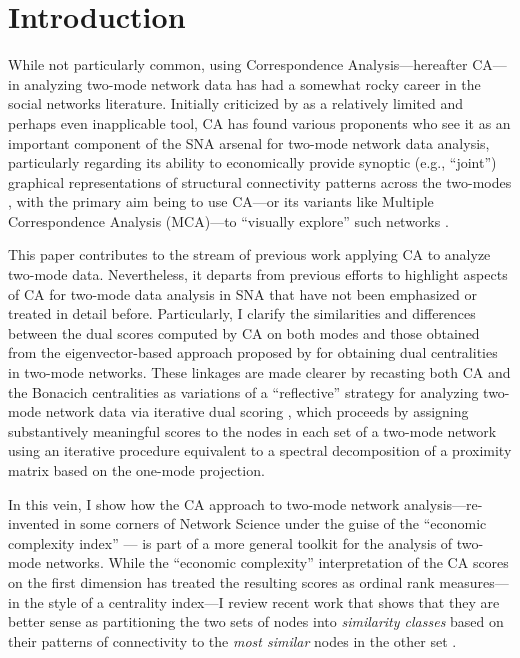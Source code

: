 \documentclass[a4paper,fleqn]{cas-sc}
\begin{document}
\section{Introduction} \label{sec:intro}
While not particularly common, using Correspondence Analysis---hereafter CA---in analyzing two-mode network data has had a somewhat rocky career in the social networks literature. Initially criticized by \citet{borgatti1997network} as a relatively limited and perhaps even inapplicable tool, CA has found various proponents who see it as an important component of the SNA arsenal for two-mode network data analysis, particularly regarding its ability to economically provide synoptic (e.g., ``joint'') graphical representations of structural connectivity patterns across the two-modes \citep{roberts2000correspondence, breiger2000tool, faust2005using}, with the primary aim being to use CA---or its variants like Multiple Correspondence Analysis (MCA)---to ``visually explore'' such networks \citep{desposito2014use}. 

This paper contributes to the stream of previous work applying CA to analyze two-mode data. Nevertheless, it departs from previous efforts to highlight aspects of CA for two-mode data analysis in SNA that have not been emphasized or treated in detail before. Particularly, I clarify the similarities and differences between the dual scores computed by CA on both modes and those obtained from the eigenvector-based approach proposed by \citet{bonacich1991simultaneous} for obtaining dual centralities in two-mode networks. These linkages are made clearer by recasting both CA and the Bonacich centralities as variations of a ``reflective'' strategy for analyzing two-mode network data via iterative dual scoring \citep{yang2022comparing, yang2020birank}, which proceeds by assigning substantively meaningful scores to the nodes in each set of a two-mode network using an iterative procedure equivalent to a spectral decomposition of a proximity matrix based on the one-mode projection. 

In this vein, I show how the CA approach to two-mode network analysis---re-invented in some corners of Network Science under the guise of the ``economic complexity index'' \citep{hidalgo2009building, mealy2019interpreting, van2021correspondence}--- is part of a more general toolkit for the analysis of two-mode networks. While the ``economic complexity'' interpretation of the CA scores on the first dimension has treated the resulting scores as ordinal rank measures---in the style of a centrality index---I review recent work that shows that they are better sense as partitioning the two sets of nodes into \textit{similarity classes} based on their patterns of connectivity to the \textit{most similar} nodes in the other set \citep{kovacs2010generalized, lizardo2024two}.
\end{document}
